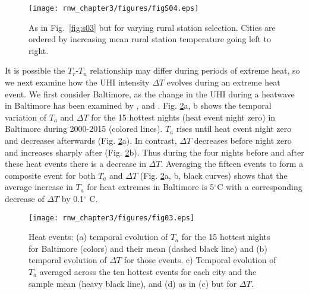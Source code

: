 {%
\begin{figure}
\texttt{[image: rnw\_chapter3/figures/figS04.eps]}
\caption{As in Fig.~\ref{fig:s03} but for varying rural station selection. Cities are ordered by increasing mean rural station temperature going left to right.
\label{fig:s04}
}
\end{figure}


It is possible the $T_r$-$T_u$ relationship may differ during periods of extreme heat, so we next examine how the UHI intensity $\Delta T$ evolves during an extreme heat event. We first consider Baltimore, as the change in the UHI during a heatwave in Baltimore has been examined by \cite{li2013synergistic}, \cite{li2014effectiveness} and \cite{li2015contrasting}. Fig. \ref{fig:hw4}a, b shows the temporal variation of $T_a$ and $\Delta T$ for the 15 hottest nights (heat event night zero) in Baltimore during 2000-2015 (colored lines). 
$T_a$ rises until heat event night zero and decreases afterwards (Fig. \ref{fig:hw4}a). In contrast, $\Delta T$ decreases before night zero and increases sharply after (Fig. \ref{fig:hw4}b). Thus during the four nights before and after these heat events there is a decrease in $\Delta T$. 
Averaging the fifteen events to form a composite event for both $T_a$ and $\Delta T$ (Fig. \ref{fig:hw4}a, b, black curves) shows that the average increase in $T_a$ for heat extremes in Baltimore is 
5$^\circ$C with a corresponding decrease of $\Delta T$ by 0.1$^\circ$ C. 

\begin{figure}
\texttt{[image: rnw\_chapter3/figures/fig03.eps]} 

\caption{Heat events: (a) temporal evolution of $T_a$ for the 15 hottest nights  for Baltimore (colors) and their mean (dashed black line) and (b) temporal evolution of $\Delta T$ for those events. c) Temporal evolution of $T_a$ averaged across the ten hottest events for each city and the sample mean (heavy black line), and (d) as in (c) but for $\Delta T$. 
}
\label{fig:hw4}
\end{figure}

}
